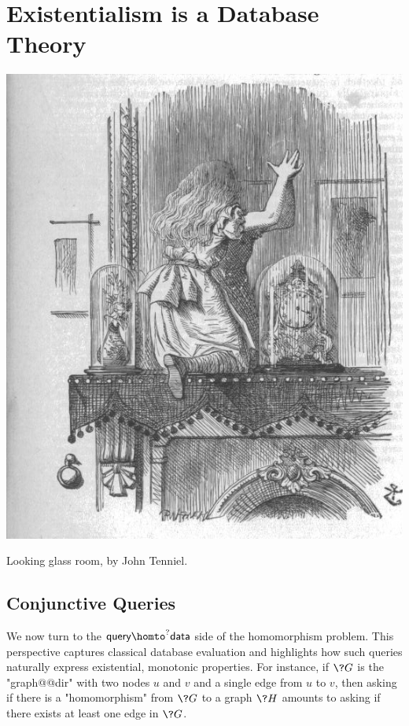 \section{Existentialism is a Database Theory}
\label{sec:intro-existential}

\begin{marginfigure}[15em]
	\centering
	\includegraphics[width=\linewidth]{fig/intro/aliceroom.jpg}
	\caption{Looking glass room, by John Tenniel.}
\end{marginfigure}

\subsection{Conjunctive Queries}

We now turn to the $\textsf{query} \homto^? \textsf{data}$ side of the homomorphism problem. This perspective captures classical database evaluation and highlights how such queries naturally express existential, monotonic properties.
For instance, if $\?G$ is the "graph@@dir" with
two nodes $u$ and $v$ and a single edge from $u$ to $v$,
then asking if there is a "homomorphism" from $\?G$ to a graph $\?H$ amounts
to asking if there exists at least one edge in $\?G$.

